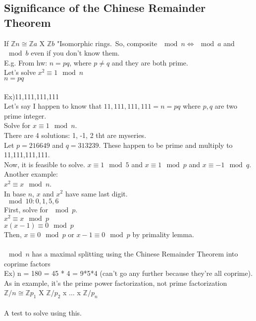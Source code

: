 \documentclass[13pt]{article}
\begin{document}
	\subsection*{Significance of the Chinese Remainder Theorem}
	If $\mathbb{Z}{n} \cong \mathbb{Z}{a}$ X $\mathbb{Z}{b}$ "Isomorphic
	rings.\
	So, composite $\mod n \Leftrightarrow \mod a$ and $\mod b$ even if you don't
	know them.\\
	E.g. From hw: $n = pq$, where $p \not= q$ and they are both prime.\\
	Let's solve $x^2 \equiv 1  \mod n$\\
	$n = pq$\\\\
	Ex)11,111,111,111\\
	Let's say I happen to know that $11,111,111,111 = n = pq$ where $p,q$
	are two prime integer.\\
	Solve for $x \equiv 1 \mod n$.\\
	There are 4 solutions: 1, -1, 2 tht are myseries.\\
	Let $p = 216649$ and $q = 313239$. These happen to be prime and multiply
	to 11,111,111,111.\\
	Now, it is feasible to solve. $x \equiv 1 \mod 5$ and $x \equiv 1 \mod p$
	and $x \equiv -1 \mod q$.\\
	Another example:\\
		$x^2 \equiv x \mod n$.\\
		In base $n$, $x$ and $x^2$ have same last digit.\\
		$\mod 10: 0, 1, 5, 6$\\
		First, solve for $\mod p$.\\
		$x^2 \equiv x \mod p$\\
		$x(x-1) \equiv 0 \mod p$\\
		Then, $x \equiv 0 \mod p$ or $x - 1 \equiv 0 \mod p$ by primality lemma.
		\\\\
%
	$\mod n$ has a maximal splitting using the Chinese Remainder Theorem
	into coprime factors\\
	Ex) n = 180 = 45 * 4 = 9*5*4 (can't go any further because they're all
	coprime).\\
	As in example, it's the prime power factorization, not prime factorization
	\\
	$\mathbb{Z}/n \cong \mathbb{Z}p_1$ X $\mathbb{Z}/p_2$ x $\ldots$ x 
	$\mathbb{Z}/p_n$\\\\
	A test to solve using this.\\
\end{document}
